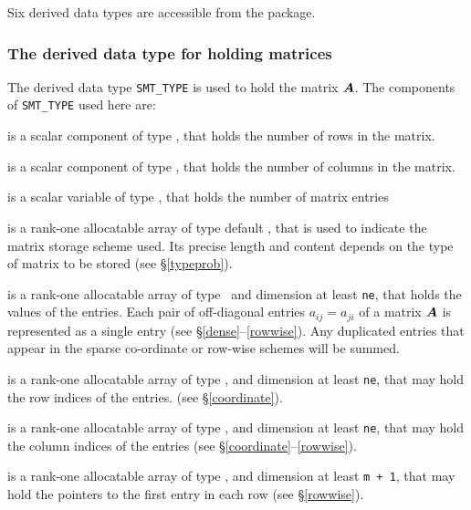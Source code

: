 \documentclass{galahad}
\begin{document}






\galtypes
Six derived data types are accessible from the package.


\subsubsection{The derived data type for holding matrices}\label{typesmt}
The derived data type {\tt SMT\_TYPE} is used to hold the matrix ${\bm{A}}$.
The components of {\tt SMT\_TYPE} used here are:

\begin{description}

 is a scalar component of type \integer, 
that holds the number of rows in the matrix. 
 
 is a scalar component of type \integer, 
that holds the number of columns in the matrix. 
 
 is a scalar variable of type \integer, that
holds the number of matrix entries

 is a rank-one allocatable array of type default \character, that
is used to indicate the matrix storage scheme used. Its precise length and
content depends on the type of matrix to be stored (see \S\ref{typeprob}).

 is a rank-one allocatable array of type \realdp\, 
and dimension at least {\tt ne}, that holds the values of the entries. 
Each pair of off-diagonal entries $a_{ij} = a_{ji}$ of a matrix ${\bm{A}}$ 
is represented as a single entry 
(see \S\ref{dense}--\ref{rowwise}).
Any duplicated entries that appear in the sparse 
co-ordinate or row-wise schemes will be summed. 

 is a rank-one allocatable array of type \integer, 
and dimension at least {\tt ne}, that may hold the row indices of the entries. 
(see \S\ref{coordinate}).

 is a rank-one allocatable array of type \integer, 
and dimension at least {\tt ne}, that may hold the column indices of the entries
(see \S\ref{coordinate}--\ref{rowwise}).

 is a rank-one allocatable array of type \integer, 
and dimension at least {\tt m + 1}, that may hold the pointers to
the first entry in each row (see \S\ref{rowwise}).

\end{description}
\end{document}
